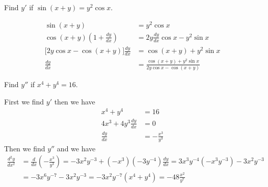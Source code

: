 \begin{problem}
    Find \(y'\) if \(\sin(x+y)=y^2\cos x\).
\end{problem}
\begin{solution}
    \begin{align*}
        \sin(x+y) &= y^2\cos x \\
        \cos(x+y)(1+\frac{dy}{dx}) &= 2y\frac{dy}{dx}\cos x-y^2\sin x \\
        \big[2y\cos x-\cos(x+y)\big]\frac{dy}{dx} &= \cos(x+y)+y^2\sin x \\
        \frac{dy}{dx}
        &= \frac{\cos(x+y)+y^2\sin x}{2y\cos x-\cos(x+y)} 
    \end{align*}
\end{solution}
\begin{problem}
    Find \(y''\) if \(x^4+y^4=16\).
\end{problem}
\begin{solution}
    First we find \(y'\) then we have
    \begin{align*}
        x^4+y^4 &= 16 \\ 4x^3+4y^3\frac{dy}{dx} &= 0 \\
        \frac{dy}{dx} &= -\frac{x^3}{y^3}
    \end{align*}
    Then we find \(y''\) and we have
    \begin{align*}
        \frac{d^2y}{dx^2} &= \frac{d}{dx}\left(-\frac{x^3}{y^3}\right)
        =-3x^2y^{-3}+(-x^3)(-3y^{-4})\frac{dy}{dx}
        =3x^3y^{-4}(-x^3y^{-3})-3x^2y^{-3} \\
        &= -3x^6y^{-7}-3x^2y^{-3}
        =-3x^2y^{-7}(x^4+y^4)=-48\frac{x^2}{y^7} 
    \end{align*}
\end{solution}